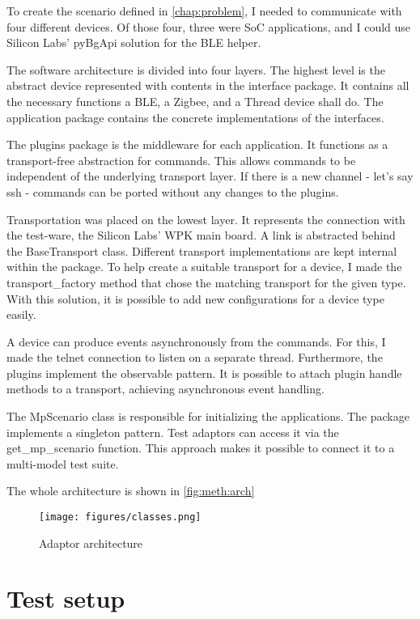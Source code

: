To create the scenario defined in \autoref{chap:problem}, I needed to communicate with four different devices. Of those four, three were SoC applications, and I could use Silicon Labs' pyBgApi solution for the BLE helper.

The software architecture is divided into four layers. The highest level is the abstract device represented with contents in the interface package. It contains all the necessary functions a BLE, a Zigbee, and a Thread device shall do. The application package contains the concrete implementations of the interfaces.

The plugins package is the middleware for each application. It functions as a transport-free abstraction for commands. This allows commands to be independent of the underlying transport layer. If there is a new channel - let's say ssh - commands can be ported without any changes to the plugins.

Transportation was placed on the lowest layer. It represents the connection with the test-ware, the Silicon Labs' WPK main board. A link is abstracted behind the BaseTransport class. Different transport implementations are kept internal within the package. To help create a suitable transport for a device, I made the transport\_factory method that chose the matching transport for the given type. With this solution, it is possible to add new configurations for a device type easily.

A device can produce events asynchronously from the commands. For this, I made the telnet connection to listen on a separate thread. Furthermore, the plugins implement the observable pattern. It is possible to attach plugin handle methods to a transport, achieving asynchronous event handling.

The MpScenario class is responsible for initializing the applications. The package implements a singleton pattern. Test adaptors can access it via the get\_mp\_scenario function. This approach makes it possible to connect it to a multi-model test suite.

The whole architecture is shown in \autoref{fig:meth:arch}

\begin{figure}
    \centering
    \texttt{[image: figures/classes.png]}
    \caption{Adaptor architecture}
    \label{fig:meth:arch}
\end{figure}

\section{Test setup}
\label{sec:meth:ts}


